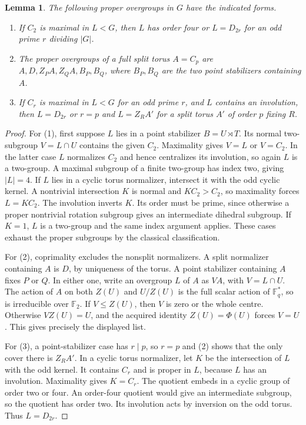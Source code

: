 \documentclass[11pt,a4paper]{article}
\newtheorem{lemma}{Lemma}
\newcommand{\F}{\mathbb F}
\begin{document}
\begin{lemma}\label{covers}
The following proper overgroups in $G$ have the indicated forms.
\begin{enumerate}
\item If $C_2$ is maximal in $L<G$, then $L$ has order four or
      $L=D_{2r}$ for an odd prime $r$ dividing $|G|$.
\item The proper overgroups of a full split torus $A=C_p$ are
      $A,D,Z_PA,Z_QA,B_P,B_Q$, where $B_P,B_Q$ are the two point
      stabilizers containing $A$.
\item If $C_r$ is maximal in $L<G$ for an odd prime $r$, and $L$
      contains an involution, then $L=D_{2r}$ or $r=p$ and
      $L=Z_RA'$ for a split torus $A'$ of order $p$ fixing $R$.
\end{enumerate}
\end{lemma}
\begin{proof}
For (1), first suppose $L$ lies in a point stabilizer $B=U\rtimes T$.
Its normal two-subgroup $V=L\cap U$ contains the given $C_2$.
Maximality gives $V=L$ or $V=C_2$. In the latter case $L$ normalizes
$C_2$ and hence centralizes its involution, so again $L$ is a two-group.
A maximal subgroup of a finite two-group has index two, giving $|L|=4$.
If $L$ lies in a cyclic torus normalizer, intersect it with the odd
cyclic kernel. A nontrivial intersection $K$ is normal and
$K C_2>C_2$, so maximality forces $L=K C_2$. The involution inverts
$K$. Its order must be prime, since otherwise a proper nontrivial
rotation subgroup gives an intermediate dihedral subgroup. If $K=1$,
$L$ is a two-group and the same index argument applies. These cases
exhaust the proper subgroups by the classical classification.

For (2), coprimality excludes the nonsplit normalizers. A split
normalizer containing $A$ is $D$, by uniqueness of the torus. A point
stabilizer containing $A$ fixes $P$ or $Q$. In either one, write an
overgroup $L$ of $A$ as $VA$, with $V=L\cap U$. The action of $A$
on both $Z(U)$ and $U/Z(U)$ is the full scalar action of $\F_q^*$,
so is irreducible over $\F_2$. If $V\le Z(U)$, then $V$ is zero
or the whole centre. Otherwise $VZ(U)=U$, and the acquired identity
$Z(U)=\Phi(U)$ forces $V=U$. This gives precisely the displayed list.

For (3), a point-stabilizer case has $r\mid p$, so $r=p$ and
(2) shows that the only cover there is $Z_RA'$. In a cyclic torus
normalizer, let $K$ be the intersection of $L$ with the odd kernel.
It contains $C_r$ and is proper in $L$, because $L$ has an involution.
Maximality gives $K=C_r$. The quotient embeds in a cyclic group of
order two or four. An order-four quotient would give an intermediate
subgroup, so the quotient has order two. Its involution acts by
inversion on the odd torus. Thus $L=D_{2r}$.
\end{proof}
\end{document}
